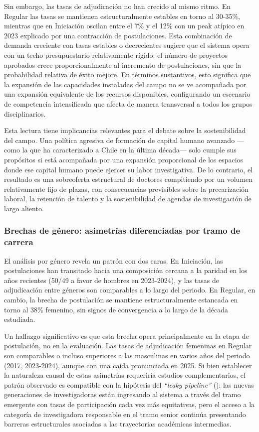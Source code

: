 \documentclass[
  12pt,
  letterpaper,
]{article}
\begin{document}
Sin embargo, las tasas de adjudicación no han crecido al mismo ritmo. En
Regular las tasas se mantienen estructuralmente estables en torno al
30-35\%, mientras que en Iniciación oscilan entre el 7\% y el 12\% con
un peak atípico en 2023 explicado por una contracción de postulaciones.
Esta combinación de demanda creciente con tasas estables o decrecientes
sugiere que el sistema opera con un techo presupuestario relativamente
rígido: el número de proyectos aprobados crece proporcionalmente al
incremento de postulaciones, sin que la probabilidad relativa de éxito
mejore. En términos sustantivos, esto significa que la expansión de las
capacidades instaladas del campo no se ve acompañada por una expansión
equivalente de los recursos disponibles, configurando un escenario de
competencia intensificada que afecta de manera transversal a todos los
grupos disciplinarios.

Esta lectura tiene implicancias relevantes para el debate sobre la
sostenibilidad del campo. Una política agresiva de formación de capital
humano avanzado ---como la que ha caracterizado a Chile en la última
década--- solo cumple sus propósitos si está acompañada por una
expansión proporcional de los espacios donde ese capital humano puede
ejercer su labor investigativa. De lo contrario, el resultado es una
sobreoferta estructural de doctores compitiendo por un volumen
relativamente fijo de plazas, con consecuencias previsibles sobre la
precarización laboral, la retención de talento y la sostenibilidad de
agendas de investigación de largo aliento.

\subsubsection{Brechas de género: asimetrías diferenciadas por tramo de
carrera}\label{brechas-de-guxe9nero-asimetruxedas-diferenciadas-por-tramo-de-carrera}

El análisis por género revela un patrón con dos caras. En Iniciación,
las postulaciones han transitado hacia una composición cercana a la
paridad en los años recientes (50/49 a favor de hombres en 2023-2024), y
las tasas de adjudicación entre géneros son comparables a lo largo del
periodo. En Regular, en cambio, la brecha de postulación se mantiene
estructuralmente estancada en torno al 38\% femenino, sin signos de
convergencia a lo largo de la década estudiada.

Un hallazgo significativo es que esta brecha opera principalmente en la
etapa de postulación, no en la evaluación. Las tasas de adjudicación
femeninas en Regular son comparables o incluso superiores a las
masculinas en varios años del periodo (2017, 2023-2024), aunque con una
caída pronunciada en 2025. Si bien establecer la naturaleza causal de
estas asimetrías requeriría estudios complementarios, el patrón
observado es compatible con la hipótesis del \emph{``leaky pipeline''}
(): las
nuevas generaciones de investigadoras están ingresando al sistema a
través del tramo emergente con tasas de participación cada vez más
equitativas, pero el acceso a la categoría de investigadora responsable
en el tramo senior continúa presentando barreras estructurales asociadas
a las trayectorias académicas intermedias.
\end{document}
